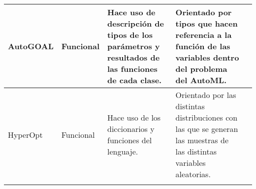 \begin{longtable}{  p{2.15cm}  p{2.4cm}  p{4.75cm}  p{4.65cm}  p{5.45cm} }
    AutoGOAL                                                                                                                                                                                                                                                                                                                     &
    Funcional                                                                                                                                                                                                                                                                                                                    &
    Hace uso de descripción de tipos de los parámetros y resultados de las funciones de cada clase.                                                                                                                                                                                                                               &
    Orientado por tipos que hacen referencia a la función de las variables dentro del problema del AutoML.                                                                                                                                                                                                                         &
    \\
    \hline
    HyperOpt                                                                                                                                                                                                                                                                                                                     &
    Funcional                                                                                                                                                                                                                                                                                                                    &
    Hace uso de los diccionarios y funciones del lenguaje.                                                                                                                                                                                                                                                                        &
    Orientado por las distintas distribuciones con las que se generan las muestras de las distintas variables aleatorias.                                                                                                                                                                                                         &
    \\
    \hline
    \rowcolor{lavender}


\end{longtable}
